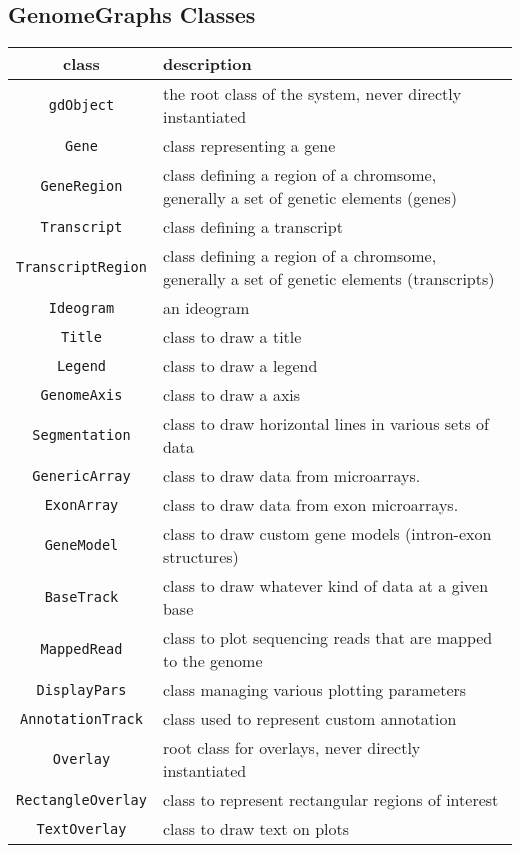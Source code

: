 \documentclass[11pt]{article}
\begin{document}
\subsection{GenomeGraphs Classes}
\begin{table}[bp!]
    \begin{center}
      \begin{tabular}{@{}cp{8cm}@{}}
        \hline
        class & description \\
        \hline
        \texttt{gdObject} &  the root class of the system, never directly instantiated \\
        \texttt{Gene} &  class representing a gene \\
        \texttt{GeneRegion} & class defining a region of a
        chromsome, generally a set of genetic elements (genes) \\
        \texttt{Transcript} & class defining a transcript \\
        \texttt{TranscriptRegion} &  class defining a region of a chromsome, generally a set of genetic elements (transcripts)\\
        \texttt{Ideogram} &  an ideogram \\
        \texttt{Title} &  class to draw a title  \\
        \texttt{Legend} &  class to draw a legend  \\
        \texttt{GenomeAxis} &  class to draw a axis \\
        \texttt{Segmentation} &  class to draw horizontal lines in various sets of data \\
        \texttt{GenericArray} &  class to draw data from microarrays. \\
        \texttt{ExonArray} &  class to draw data from exon microarrays. \\
        \texttt{GeneModel} & class to draw custom gene models (intron-exon structures)  \\
        \texttt{BaseTrack} &  class to draw whatever kind of data at a given base \\
        \texttt{MappedRead} &  class to plot sequencing reads that are mapped to the genome \\
        \texttt{DisplayPars} & class managing various plotting parameters \\
        \texttt{AnnotationTrack} & class used to represent custom annotation \\
        \texttt{Overlay} & root class for overlays, never directly instantiated \\
        \texttt{RectangleOverlay} & class to represent rectangular regions of interest \\
        \texttt{TextOverlay} & class to draw text on plots \\
        \hline
      \end{tabular}
    \end{center}
  \end{table}
\end{document}
